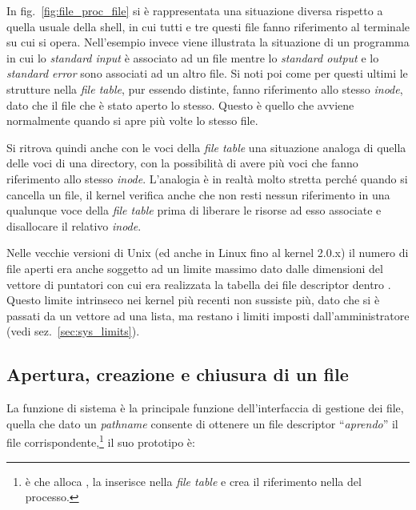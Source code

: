 
In fig.~\ref{fig:file_proc_file} si è rappresentata una situazione diversa
rispetto a quella usuale della shell, in cui tutti e tre questi file fanno
riferimento al terminale su cui si opera. Nell'esempio invece viene illustrata
la situazione di un programma in cui lo \textit{standard input} è associato ad
un file mentre lo \textit{standard output} e lo \textit{standard error} sono
associati ad un altro file.  Si noti poi come per questi ultimi le strutture
 nella \textit{file table}, pur essendo distinte, fanno
riferimento allo stesso \textit{inode}, dato che il file che è stato aperto lo
stesso. Questo è quello che avviene normalmente quando si apre più volte lo
stesso file.

Si ritrova quindi anche con le voci della \textit{file table} una situazione
analoga di quella delle voci di una directory, con la possibilità di avere più
voci che fanno riferimento allo stesso \textit{inode}. L'analogia è in realtà
molto stretta perché quando si cancella un file, il kernel verifica anche che
non resti nessun riferimento in una qualunque voce della \textit{file table}
prima di liberare le risorse ad esso associate e disallocare il relativo
\textit{inode}.

Nelle vecchie versioni di Unix (ed anche in Linux fino al kernel 2.0.x) il
numero di file aperti era anche soggetto ad un limite massimo dato dalle
dimensioni del vettore di puntatori con cui era realizzata la tabella dei file
descriptor dentro . Questo limite intrinseco nei kernel
più recenti non sussiste più, dato che si è passati da un vettore ad una
lista, ma restano i limiti imposti dall'amministratore (vedi
sez.~\ref{sec:sys_limits}).



\subsection{Apertura, creazione e chiusura di un file}
\label{sec:file_open_close}

La funzione di sistema  è la principale funzione dell'interfaccia
di gestione dei file, quella che dato un \textit{pathname} consente di
ottenere un file descriptor ``\textsl{aprendo}'' il file
corrispondente,\footnote{è  che alloca , la inserisce
  nella \textit{file table} e crea il riferimento nella
   del processo.} il suo prototipo è:

